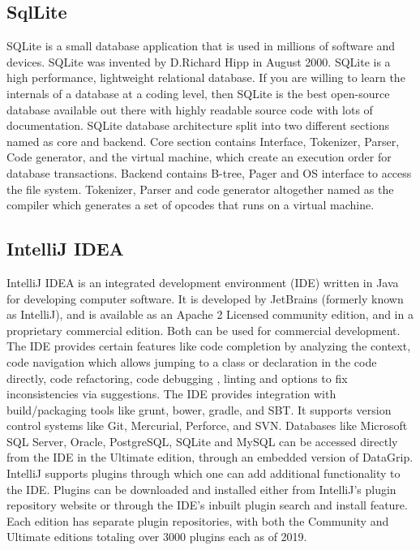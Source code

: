\documentclass[oneside,12pt]{Classes/VTU}
\begin{document}
	\subsection{SqlLite}
	SQLite is a small database application that is used in millions of software and devices. SQLite was invented by D.Richard Hipp in August 2000. SQLite is a high performance, lightweight relational database. If you are willing to learn the internals of a database at a coding level, then SQLite is the best open-source database available out there with highly readable source code with lots of documentation. SQLite database architecture split into two different sections named as core and backend. Core section contains Interface, Tokenizer, Parser, Code generator, and the virtual machine, which create an execution order for database transactions. Backend contains B-tree, Pager and OS interface to access the file system. Tokenizer, Parser and code generator altogether named as the compiler which generates a set of opcodes that runs on a virtual machine.
	
	\subsection{IntelliJ IDEA}
	IntelliJ IDEA is an integrated development environment (IDE) written in Java for developing computer software. It is developed by JetBrains (formerly known as IntelliJ), and is available as an Apache 2 Licensed community edition, and in a proprietary commercial edition. Both can be used for commercial development. The IDE provides certain features like code completion by analyzing the context, code navigation which allows jumping to a class or declaration in the code directly, code refactoring, code debugging , linting and options to fix inconsistencies via suggestions. The IDE provides integration with build/packaging tools like grunt, bower, gradle, and SBT. It supports version control systems like Git, Mercurial, Perforce, and SVN. Databases like Microsoft SQL Server, Oracle, PostgreSQL, SQLite and MySQL can be accessed directly from the IDE in the Ultimate edition, through an embedded version of DataGrip. IntelliJ supports plugins through which one can add additional functionality to the IDE. Plugins can be downloaded and installed either from IntelliJ's plugin repository website or through the IDE's inbuilt plugin search and install feature. Each edition has separate plugin repositories, with both the Community and Ultimate editions totaling over 3000 plugins each as of 2019.
	
\end{document}
